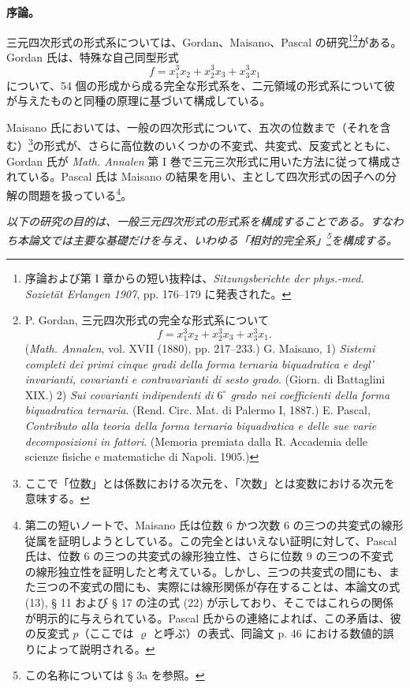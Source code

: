 \documentclass[11pt]{jlreq}
\begin{document}
\vspace{3em}

\begin{center}
\textbf{序論。}
\end{center}

三元四次形式の形式系については、Gordan、Maisano、Pascal の研究\footnote{序論および第 I 章からの短い抜粋は、\emph{Sitzungsberichte der phys.-med. Sozietät Erlangen 1907}, pp. 176--179 に発表された。}\footnote{P. Gordan, 三元四次形式の完全な形式系について
\[
f=x_1^3x_2+x_2^3x_3+x_3^3x_1.
\]
(\emph{Math. Annalen}, vol. XVII (1880), pp. 217--233.)
G. Maisano, 1) \emph{Sistemi completi dei primi cinque gradi della forma ternaria biquadratica e degl' invarianti, covarianti e contravarianti di sesto grado}. (Giorn. di Battaglini XIX.)
2) \emph{Sui covarianti indipendenti di $6^\circ$ grado nei coefficienti della forma biquadratica ternaria}. (Rend. Circ. Mat. di Palermo I, 1887.)
E. Pascal, \emph{Contributo alla teoria della forma ternaria biquadratica e delle sue varie decomposizioni in fattori}. (Memoria premiata dalla R. Accademia delle scienze fisiche e matematiche di Napoli. 1905.)}がある。Gordan 氏は、特殊な自己同型形式
\[
f=x_1^3x_2+x_2^3x_3+x_3^3x_1
\]
について、54 個の形成から成る完全な形式系を、二元領域の形式系について彼が与えたものと同種の原理に基づいて構成している。

Maisano 氏においては、一般の四次形式について、五次の位数まで（それを含む）\footnote{ここで「位数」とは係数における次元を、「次数」とは変数における次元を意味する。}の形式が、さらに高位数のいくつかの不変式、共変式、反変式とともに、Gordan 氏が \emph{Math. Annalen} 第 I 巻で三元三次形式に用いた方法に従って構成されている。Pascal 氏は Maisano の結果を用い、主として四次形式の因子への分解の問題を扱っている\footnote{第二の短いノートで、Maisano 氏は位数 6 かつ次数 6 の三つの共変式の線形従属を証明しようとしている。この完全とはいえない証明に対して、Pascal 氏は、位数 6 の三つの共変式の線形独立性、さらに位数 9 の三つの不変式の線形独立性を証明したと考えている。しかし、三つの共変式の間にも、また三つの不変式の間にも、実際には線形関係が存在することは、本論文の式 (13), § 11 および § 17 の注の式 (22) が示しており、そこではこれらの関係が明示的に与えられている。Pascal 氏からの連絡によれば、この矛盾は、彼の反変式 $p$（ここでは $\varrho$ と呼ぶ）の表式、同論文 p. 46 における数値的誤りによって説明される。}。

\emph{以下の研究の目的は、一般三元四次形式の形式系を構成することである。すなわち本論文では主要な基礎だけを与え、いわゆる「相対的完全系」\footnote{この名称については § 3a を参照。}を構成する。}
\end{document}
